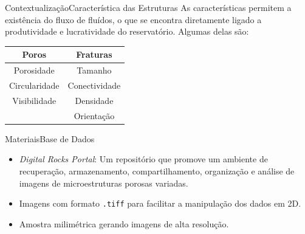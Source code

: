 \documentclass{beamer}
\begin{document}
\begin{frame}{Contextualização}{Característica das Estruturas}
   As características permitem a existência do fluxo de fluídos, o que se encontra diretamente ligado a produtividade e lucratividade do reservatório. Algumas delas são:
   
    \begin{table}[]
        \begin{tabular}{c|c}
       \textbf{Poros}         &  \textbf{Fraturas}      \\ \hline
        Porosidade            & Tamanho       \\
        Circularidade         & Conectividade \\
        Visibilidade          & Densidade     \\
        \multicolumn{1}{l|}{} & Orientação   
        \end{tabular}
    \end{table}
\end{frame}

\begin{frame}{Materiais}{Base de Dados}
    \begin{itemize}
        \item \textit{Digital Rocks Portal}: Um repositório que promove um ambiente de recuperação, armazenamento, compartilhamento, organização e análise de imagens de microestruturas porosas variadas.
        \item Imagens com formato \texttt{.tiff} para facilitar a manipulação dos dados em 2D.
        \item Amostra milimétrica gerando imagens de alta resolução. 
    \end{itemize}
    
\end{frame}
\end{document}
